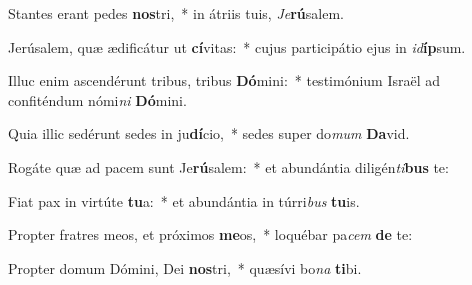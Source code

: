 \item Stantes erant pedes \textbf{nos}tri,~* in átriis tuis, \textit{Je}\textbf{rú}salem.
\item Jerúsalem, quæ ædificátur ut \textbf{cí}vitas:~* cujus participátio ejus in \textit{id}\textbf{íp}sum.
\item Illuc enim ascendérunt tribus, tribus \textbf{Dó}mini:~* testimónium Israël ad confiténdum nómi\textit{ni} \textbf{Dó}mini.
\item Quia illic sedérunt sedes in ju\textbf{dí}cio,~* sedes super do\textit{mum} \textbf{Da}vid.
\item Rogáte quæ ad pacem sunt Je\textbf{rú}salem:~* et abundántia diligén\textit{ti}\textbf{bus} te:
\item Fiat pax in virtúte \textbf{tu}a:~* et abundántia in túrri\textit{bus} \textbf{tu}is.
\item Propter fratres meos, et próximos \textbf{me}os,~* loquébar pa\textit{cem} \textbf{de} te:
\item Propter domum Dómini, Dei \textbf{nos}tri,~* quæsívi bo\textit{na} \textbf{ti}bi.
